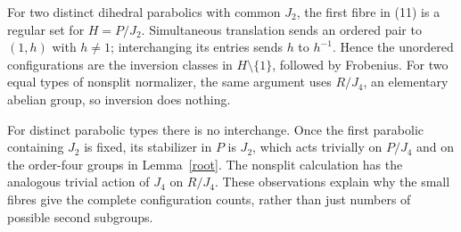 \documentclass[11pt,a4paper]{article}
\begin{document}
For two distinct dihedral parabolics with common $J_2$, the first
fibre in (11) is a regular set for $H=P/J_2$. Simultaneous
translation sends an ordered pair to $(1,h)$ with $h\ne1$;
interchanging its entries sends $h$ to $h^{-1}$. Hence the
unordered configurations are the inversion classes in
$H\setminus\{1\}$, followed by Frobenius. For two equal types
of nonsplit normalizer, the same argument uses $R/J_4$, an
elementary abelian group, so inversion does nothing.

For distinct parabolic types there is no interchange. Once the
first parabolic containing $J_2$ is fixed, its stabilizer in $P$
is $J_2$, which acts trivially on $P/J_4$ and on the order-four
groups in Lemma~\ref{root}. The nonsplit calculation has the
analogous trivial action of $J_4$ on $R/J_4$. These observations
explain why the small fibres give the complete configuration
counts, rather than just numbers of possible second subgroups.
\end{document}
